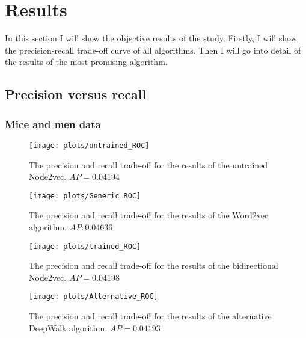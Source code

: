 \documentclass{article}
\begin{document}
 \newpage
 \section{Results} \label{results}
 
 In this section I will show the objective results of the study. Firstly, I will show the precision-recall trade-off curve of all algorithms. Then I will go into detail of the results of the most promising algorithm.
 
 \subsection{Precision versus recall}
  \subsubsection{Mice and men data}
  \begin{figure}[H]
   \centering
   \texttt{[image: plots/untrained\_ROC]}
   \caption[Precision-recall curve untrained mice]{The precision and recall trade-off for the results of the untrained Node2vec. $AP = 0.04194$}
   \label{ROC_untrained}
  \end{figure}
 
  \begin{figure}[H]
   \centering
   \texttt{[image: plots/Generic\_ROC]}
   \caption[Precision-recall curve pre-trained mice]{The precision and recall trade-off for the results of the Word2vec algorithm. $AP: 0.04636$}
   \label{ROC_generic}
  \end{figure}
 
  \begin{figure}[H]
   \centering
   \texttt{[image: plots/trained\_ROC]}
   \caption[Precision-recall curve trained mice model]{The precision and recall trade-off for the results of the bidirectional Node2vec. $AP = 0.04198$}
   \label{ROC_trained}
  \end{figure}
  
  \begin{figure}[H]
   \centering
   \texttt{[image: plots/Alternative\_ROC]}
   \caption[Precision-recall curve DeepWalk mice]{The precision and recall trade-off for the results of the alternative DeepWalk algorithm. $AP = 0.04193$}
   \label{ROC_alternative}
  \end{figure}
\end{document}
